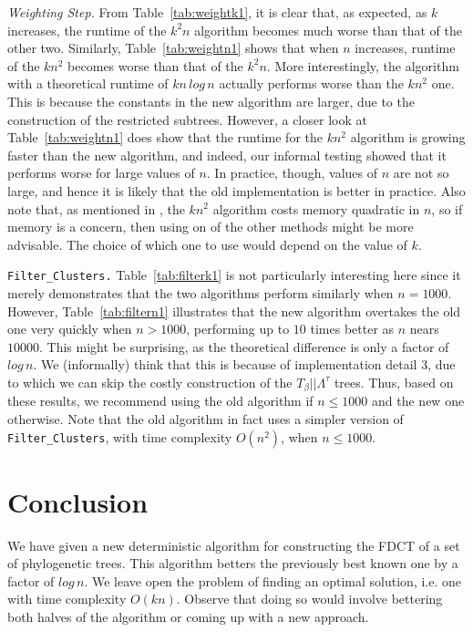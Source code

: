 \documentclass{article}
\newcommand{\leafset}{\Lambda}
\newcommand{\TB}{T_\beta}
\begin{document}
    \textit{Weighting Step.} From Table~\ref{tab:weightk1}, it is clear that, as expected, as $k$ increases, the runtime of the $k^2n$ algorithm becomes much worse than that of the other two. Similarly, Table~\ref{tab:weightn1} shows that when $n$ increases, runtime of the $kn^2$ becomes worse than that of the $k^2n$. More interestingly, the algorithm with a theoretical runtime of $kn\,log\,n$ actually performs worse than the $kn^2$ one. This is because the constants in the new algorithm are larger, due to the construction of the restricted subtrees. However, a closer look at Table~\ref{tab:weightn1} does show that the runtime for the $kn^2$ algorithm is growing faster than the new algorithm, and indeed, our informal testing showed that it performs worse for large values of $n$. In practice, though, values of $n$ are not so large, and hence it is likely that the old implementation is better in practice. Also note that, as mentioned in \cite{jansson2018algorithms}, the $kn^2$ algorithm costs memory quadratic in $n$, so if memory is a concern, then using on of the other methods might be more advisable. The choice of which one to use would depend on the value of $k$.

    \texttt{Filter\_Clusters.} Table~\ref{tab:filterk1} is not particularly interesting here since it merely demonstrates that the two algorithms perform similarly when $n = 1000$. However, Table~\ref{tab:filtern1} illustrates that the new algorithm overtakes the old one very quickly when $n > 1000$, performing up to $10$ times better as $n$ nears $10000$. This might be surprising, as the theoretical difference is only a factor of $log\,n$. We (informally) think that this is because of implementation detail 3, due to which we can skip the costly construction of the $\TB||\leafset^{\tau}$ trees. Thus, based on these results, we recommend using the old algorithm if $n \leq 1000$ and the new one otherwise. Note that the old algorithm in fact uses a simpler version of \texttt{Filter\_Clusters}, with time complexity $O(n^2)$, when $n \leq 1000$.

    \section{Conclusion}
    We have given a new deterministic algorithm for constructing the FDCT of a set of phylogenetic trees. This algorithm betters the previously best known one by a factor of $log\,n$. We leave open the problem of finding an optimal solution, i.e. one with time complexity $O(kn)$. Observe that doing so would involve bettering both halves of the algorithm or coming up with a new approach.

    \newpage
    
    
\end{document}
